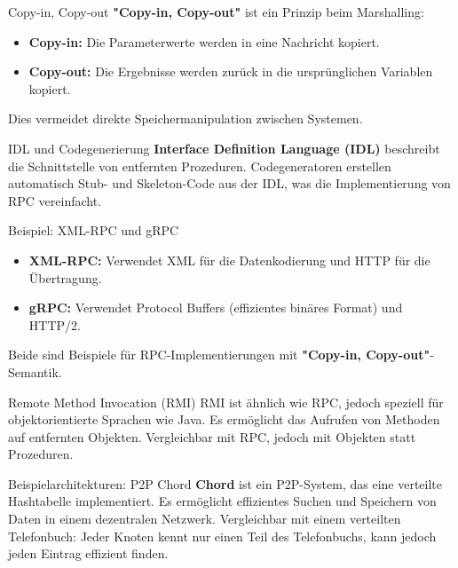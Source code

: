 \documentclass{beamer}
\begin{document}
\begin{frame}{Copy-in, Copy-out}
    \textbf{"Copy-in, Copy-out"} ist ein Prinzip beim Marshalling:
    \begin{itemize}
        \item \textbf{Copy-in:} Die Parameterwerte werden in eine Nachricht kopiert.
        \item \textbf{Copy-out:} Die Ergebnisse werden zurück in die ursprünglichen Variablen kopiert.
    \end{itemize}
    Dies vermeidet direkte Speichermanipulation zwischen Systemen.
\end{frame}

\begin{frame}{IDL und Codegenerierung}
    \textbf{Interface Definition Language (IDL)} beschreibt die Schnittstelle von entfernten Prozeduren. \newline
    Codegeneratoren erstellen automatisch Stub- und Skeleton-Code aus der IDL, was die Implementierung von RPC vereinfacht.
\end{frame}

\begin{frame}{Beispiel: XML-RPC und gRPC}
    \begin{itemize}
        \item \textbf{XML-RPC:} Verwendet XML für die Datenkodierung und HTTP für die Übertragung.
        \item \textbf{gRPC:} Verwendet Protocol Buffers (effizientes binäres Format) und HTTP/2.
    \end{itemize}
    Beide sind Beispiele für RPC-Implementierungen mit \textbf{"Copy-in, Copy-out"}-Semantik.
\end{frame}

\begin{frame}{Remote Method Invocation (RMI)}
    RMI ist ähnlich wie RPC, jedoch speziell für objektorientierte Sprachen wie Java. Es ermöglicht das Aufrufen von Methoden auf entfernten Objekten. \newline
    Vergleichbar mit RPC, jedoch mit Objekten statt Prozeduren.
\end{frame}

\begin{frame}{Beispielarchitekturen: P2P Chord}
    \textbf{Chord} ist ein P2P-System, das eine verteilte Hashtabelle implementiert. Es ermöglicht effizientes Suchen und Speichern von Daten in einem dezentralen Netzwerk. \newline
    Vergleichbar mit einem verteilten Telefonbuch: Jeder Knoten kennt nur einen Teil des Telefonbuchs, kann jedoch jeden Eintrag effizient finden.
\end{frame}
\end{document}
